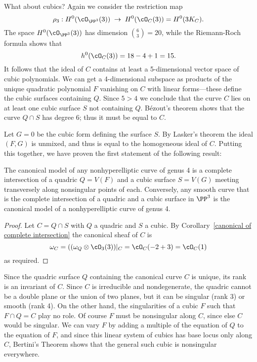 What about cubics? Again we consider the restriction map
$$
\rho_3 : H^0(\cO_{\PP^3}(3)) \; \to \; H^0(\cO_{C}(3)) = H^0(3K_C).
$$
The space $H^0(\cO_{\PP^3}(3))$ has dimension $\binom{6}{3} = 20$, while  the Riemann-Roch formula shows that
$$
h^0(\cO_C(3)) = 18 - 4 + 1 = 15.
$$
It follows that the ideal of $C$ contains at least a 5-dimensional vector space of cubic polynomials. We can get a 4-dimensional subspace as products of the unique quadratic polynomial $F$ vanishing on $C$ with linear forms---these define the cubic surfaces containing $Q$. Since $5 > 4$ we  conclude that the curve $C$ lies on at least one cubic surface $S$  not containing $Q$. 
B\'ezout's theorem shows that the curve $Q \cap S$ has degree 6; thus it must be equal to $C$. 

Let $G=0$ be the cubic form defining the surface $S$. By Lasker's theorem the ideal $(F,G)$ is unmixed, and thus is equal to the homogeneous ideal of $C$. Putting this together, we have proven the first statement of the following result:

\begin{theorem}
The canonical model of any nonhyperelliptic curve of genus 4 is a complete intersection of a quadric $Q = V(F)$ and a cubic surface $S = V(G)$ meeting transversely along nonsingular points of each. Conversely, any smooth curve that is the complete intersection of a quadric and a cubic surface in $\PP^3$ is the canonical model of a nonhyperelliptic curve of genus 4.
\end{theorem}
 
\begin{proof}
Let $C = Q\cap S$ with $Q$ a quadric and $S$ a cubic. By Corollary~\ref{canonical of complete intersection} the canonical sheaf of $C$ is 
$$
\omega_C = ((\omega_{Q} \otimes \cO_{3}(3))|_C = \cO_C(-2+3) = \cO_C(1)
$$
as required. 
\end{proof}

Since the quadric surface $Q$ containing the canonical curve $C$  is unique, its rank is an invariant of $C$.
Since $C$ is irreducible and nondegenerate, the quadric cannot be a double plane or the union of two planes, but it can be singular (rank 3) or smooth (rank 4). On the other hand, the singularities of a cubic $F$ such that $F\cap Q = C$ play no role. Of course $F$ must be nonsingular along $C$, since else 
$C$ would be singular. We can vary $F$ by adding a multiple of the equation of $Q$ to the equation of $F$, and since this linear system of cubics has base locus only along $C$, Bertini's Theorem shows that the general such cubic is nonsingular everywhere.

